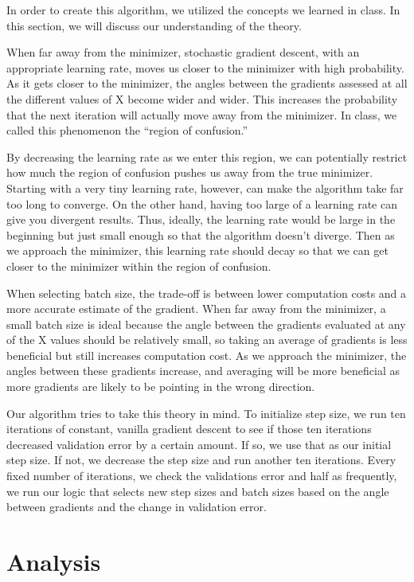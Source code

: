 \documentclass{article}
\begin{document}
\par In order to create this algorithm, we utilized the concepts we learned in class. In this section, we will discuss our understanding of the theory. 
\par When far away from the minimizer, stochastic gradient descent, with an appropriate learning rate, moves us closer to the minimizer with high probability. As it gets closer to the minimizer, the angles between the gradients assessed at all the different values of X become wider and wider. This increases the probability that the next iteration will actually move away from the minimizer. In class, we called this phenomenon the ``region of confusion.''
\par By decreasing the learning rate as we enter this region, we can potentially restrict how much the region of confusion pushes us away from the true minimizer. Starting with a very tiny learning rate, however, can make the algorithm take far too long to converge. On the other hand, having too large of a learning rate can give you divergent results. Thus, ideally, the learning rate would be large in the beginning but just small enough so that the algorithm doesn't diverge. Then as we approach the minimizer, this learning rate should decay so that we can get closer to the minimizer within the region of confusion. 
\par When selecting batch size, the trade-off is between lower computation costs and a more accurate estimate of the gradient. When far away from the minimizer, a small batch size is ideal because the angle between the gradients evaluated at any of the X values should be relatively small, so taking an average of gradients is less beneficial but still increases computation cost. As we approach the minimizer, the angles between these gradients increase, and averaging will be more beneficial as more gradients are likely to be pointing in the wrong direction. 
\par Our algorithm tries to take this theory in mind. To initialize step size, we run ten iterations of constant, vanilla gradient descent to see if those ten iterations decreased validation error by a certain amount. If so, we use that as our initial step size. If not, we decrease the step size and run another ten iterations. Every fixed number of iterations, we check the validations error and half as frequently, we run our logic that selects new step sizes and batch sizes based on the angle between gradients and the change in validation error.

\section{Analysis}
\end{document}
